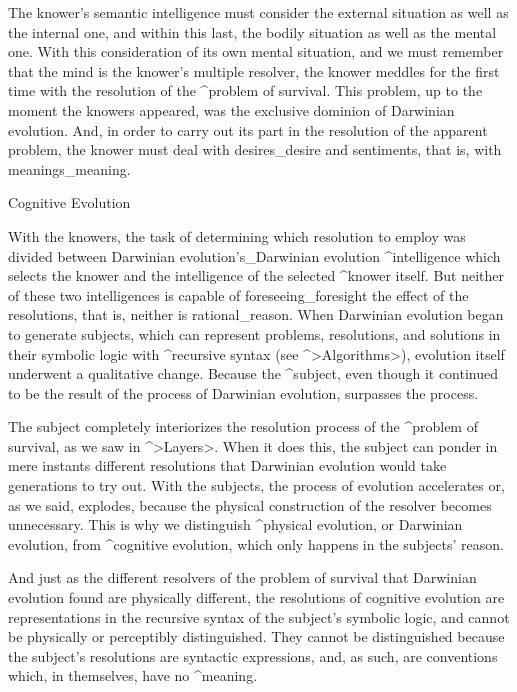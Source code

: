 The knower's semantic intelligence must consider the external situation
as well as the internal one, and within this last, the bodily situation
as well as the mental one. With this consideration of its own mental
situation, and we must remember that the mind is the knower's multiple
resolver, the knower meddles for the first time with the resolution of
the ^{problem of survival}. This problem, up to the moment the knowers
appeared, was the exclusive dominion of Darwinian evolution. And, in
order to carry out its part in the resolution of the apparent problem,
the knower must deal with desires_{desire} and sentiments, that is, with
meanings_{meaning}.


\Section Cognitive Evolution

With the knowers, the task of determining which resolution to employ was
divided between Darwinian evolution's_{Darwinian evolution}
^{intelligence} which selects the knower and the intelligence of the
selected ^{knower} itself. But neither of these two intelligences is
capable of foreseeing_{foresight} the effect of the resolutions, that
is, neither is rational_{reason}. When Darwinian evolution began to
generate subjects, which can represent problems, resolutions, and
solutions in their symbolic logic with ^{recursive syntax} (see
^>Algorithms>), evolution itself underwent a qualitative change. Because
the ^{subject}, even though it continued to be the result of the process
of Darwinian evolution, surpasses the process.

The subject completely interiorizes the resolution process of the
^{problem of survival}, as we saw in ^>Layers>. When it does this, the
subject can ponder in mere instants different resolutions that Darwinian
evolution would take generations to try out. With the subjects, the
process of evolution accelerates or, as we said, explodes, because the
physical construction of the resolver becomes unnecessary. This is why
we distinguish ^{physical evolution}, or Darwinian evolution, from
^{cognitive evolution}, which only happens in the subjects' reason.

And just as the different resolvers of the problem of survival that
Darwinian evolution found are physically different, the resolutions of
cognitive evolution are representations in the recursive syntax of the
subject's symbolic logic, and cannot be physically or perceptibly
distinguished. They cannot be distinguished because the subject's
resolutions are syntactic expressions, and, as such, are conventions
which, in themselves, have no ^{meaning}.


